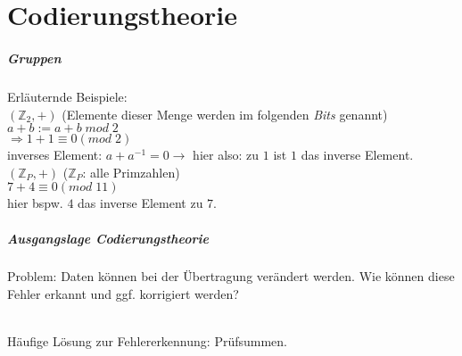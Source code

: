 \documentclass{scrreprt}
\begin{document}
\chapter{Codierungstheorie}

\paragraph{Gruppen}
Erläuternde Beispiele:\\
$(\mathbb{Z}_2,+)$ (Elemente dieser Menge werden im folgenden \emph{Bits} genannt)\\
$a+b:=a+b\; mod\; 2$\\
$\Rightarrow 1+1\equiv 0 (mod\; 2)$\\
inverses Element: $a+a^{-1}=0 \rightarrow$ hier also: zu $1$ ist $1$ das inverse Element.\medskip\\
$(\mathbb{Z}_P,+)$ ($\mathbb{Z}_P$: alle Primzahlen)\\
$7+4\equiv 0 (mod\; 11)$\\
hier bspw. $4$ das inverse Element zu $7$.

\paragraph{Ausgangslage Codierungstheorie}\parskp
Problem: Daten können bei der Übertragung verändert werden. Wie können diese Fehler erkannt und ggf. korrigiert werden?\\
\\
Häufige Lösung zur Fehlererkennung: Prüfsummen.
\end{document}

